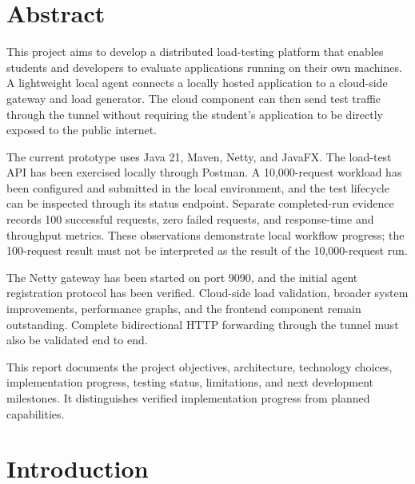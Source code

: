 \documentclass[11pt,a4paper,oneside]{report}
\begin{document}
\hypersetup{pageanchor=true}


\chapter*{Abstract}

This project aims to develop a distributed load-testing platform
that enables students and developers to evaluate applications
running on their own machines. A lightweight local agent connects
a locally hosted application to a cloud-side gateway and load
generator. The cloud component can then send test traffic through
the tunnel without requiring the student's application to be
directly exposed to the public internet.

The current prototype uses Java 21, Maven, Netty, and JavaFX.
The load-test API has been exercised locally through Postman. A
10,000-request workload has been configured and submitted in the
local environment, and the test lifecycle can be inspected through
its status endpoint. Separate completed-run evidence records 100
successful requests, zero failed requests, and response-time and
throughput metrics. These observations demonstrate local workflow
progress; the 100-request result must not be interpreted as the
result of the 10,000-request run.

The Netty gateway has been started on port 9090, and the initial
agent registration protocol has been verified. Cloud-side load
validation, broader system improvements, performance graphs, and
the frontend component remain outstanding. Complete bidirectional
HTTP forwarding through the tunnel must also be validated end to end.

This report documents the project objectives, architecture,
technology choices, implementation progress, testing status,
limitations, and next development milestones. It distinguishes
verified implementation progress from planned capabilities.

\tableofcontents
\clearpage
{}

\chapter{Introduction}
\end{document}
